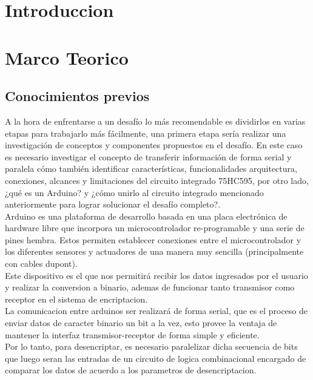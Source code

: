 \documentclass{article}
\begin{document}
\section{Introduccion}\label{intro}
\section{Marco Teorico}\label{marco}

\subsection{Conocimientos previos}

A la hora de enfrentarse a un desafío lo más recomendable es dividirlos en varias etapas para trabajarlo más fácilmente, una primera etapa sería realizar una investigación de conceptos y componentes propuestos en el desafío. En este caso es necesario investigar el concepto de transferir información de forma serial y paralela cómo también identificar características, funcionalidades arquitectura, conexiones, alcances y limitaciones del circuito integrado 75HC595, por otro lado, ¿qué es un Arduino? y ¿cómo unirlo al circuito integrado mencionado anteriormente para lograr solucionar el desafío completo?.\\

Arduino es una plataforma de desarrollo basada en una placa electrónica de hardware libre que incorpora un microcontrolador re-programable y una serie de pines hembra. Estos permiten establecer conexiones entre el microcontrolador y los diferentes sensores y actuadores de una manera muy sencilla (principalmente con cables dupont).\cite{arduinowebsite}\\
Este dispositivo es el que nos permitirá recibir los datos ingresados por el usuario y realizar la conversion a binario, ademas de funcionar tanto transmisor como receptor en el sistema de encriptacion.\\

La comunicacion entre arduinos ser realizará de forma serial, que es el proceso de enviar datos de caracter binario un bit a la vez, esto provee la ventaja de mantener la interfaz transmisor-receptor de forma simple y eficiente.\cite{serialsite}\\
Por lo tanto, para desencriptar, es necesario paralelizar dicha secuencia de bits que luego seran las entradas de un circuito de logica combinacional encargado de comparar los datos de acuerdo a los parametros de desencriptacion.
\end{document}
